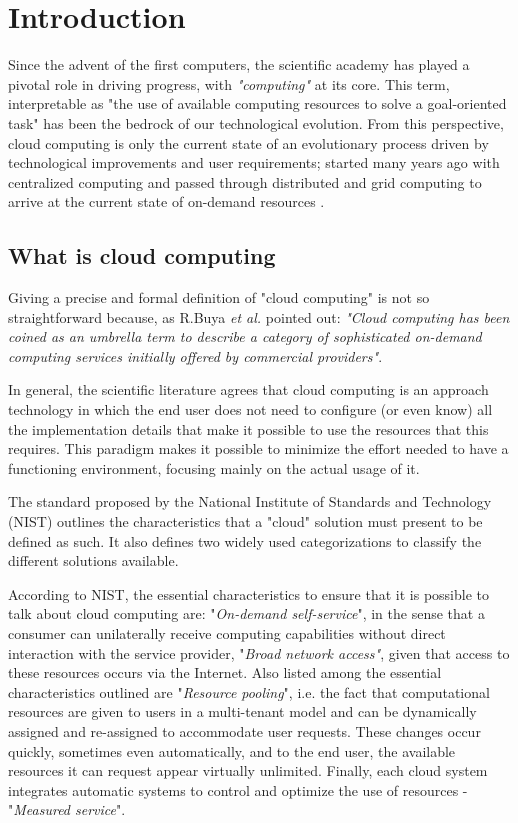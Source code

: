 \chapter{Introduction}

Since the advent of the first computers, the scientific academy has played a
pivotal role in driving progress, with \textit{"computing"} at its core. This
term, interpretable as "the use of available computing resources to solve a
goal-oriented task" has been the bedrock of our technological evolution.
From this perspective, cloud computing is only the current state of an
evolutionary process driven by technological improvements and user requirements;
started many years ago with centralized computing and passed through distributed
and grid computing to arrive at the current state of on-demand resources
\cite{Surbiryala2019CloudCH}.

\section*{What is cloud computing}

Giving a precise and formal definition of "cloud computing" is not so
straightforward because, as R.Buya \emph{et al.} \cite{RBuyya2011} pointed out:
\textit{"Cloud computing has been coined as an umbrella term to describe a category of
sophisticated on-demand computing services initially offered by commercial providers"}.

In general, the scientific literature agrees that cloud computing is an approach
technology in which the end user does not need to configure (or even know) all
the implementation details that make it possible to use the resources that this
requires. This paradigm makes it possible to minimize the effort needed to have
a functioning environment, focusing mainly on the actual usage of it.

The standard proposed by the National Institute of Standards and Technology
(NIST)\cite{nistdef} outlines the characteristics that a "cloud" solution must
present to be defined as such. It also defines two widely used categorizations
to classify the different solutions available.

According to NIST, the essential characteristics to ensure that it is possible
to talk about cloud computing are: "\textit{On-demand self-service}",
in the sense that a consumer can unilaterally receive computing capabilities
without direct interaction with the service provider, "\textit{Broad network
  access"}, given that access to these resources occurs via the Internet.
Also listed among the essential characteristics outlined are "\textit{Resource
  pooling}",
i.e. the fact that computational resources are given to users in a multi-tenant
model and can be dynamically assigned and re-assigned to accommodate user
requests.
These changes occur quickly, sometimes even automatically, and to the end user,
the available resources it can request appear virtually unlimited.
Finally, each cloud system integrates automatic systems to control and optimize
the use of resources - "\textit{Measured service}".

